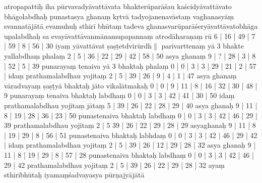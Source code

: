 \documentclass[10pt]{article}
\begin{document}
atropapattiḥ
 iha pūrvavadyāvattāvata bhakterūparāśau kaścidyāvattāvato bhāgolabdhaḥ punastasya ghanaṃ kṛtvā 
 tadyojanenavāstaṃ vaghanasyāṃ svannatājātā evamuhuḥ sthirī bhūtaṃ tadeva ghanasvarūparāśeryāvattāvatobhāga upalabdhaḥ sa evayāvattāvanmānamupapannaṃ 
atrodāharaṇaṃ rū 6 | 16 | 49 | 7 | 59 | 8 | 56 | 30 iyaṃ yāvattāvat ṣaṣṭetdvirūrdh$\|$
parivarttenaṃ yā 3 bhakte yallabdhaṃ phalaṃ 2 | 5 | 36 | 22 | 29 | 42 | 58 | 50 asya ghanaṃ 9 | ? | 28 | 3 | 8 | 52 | 5 | 39 
punarayaṃ tenaiva yā 3 bhaktaḥ phalaṃ 0 | 0 | 3 | 3 | 29 | 21 | 2 | 57 | 
idaṃ prathamalabdhau yojitaṃ 2 | 5 | 39 | 26 | 9 | 4 | 1 | 47 asya ghanaṃ vāradvayaṃ ṣaṣṭyā bhaktaḥ jāto vikalātmakaḥ 0 | 0 | 9 | 11 | 8 | 16 | 32 | 30 | 48 | 9 punarayaṃ tenaiva bhaktaḥ labdhaṃ 0 | 0 | 3 | 3 | 42 | 41 | 30 | 50 
idaṃ prathamalabdhau yojitaṃ jātaṃ 5 | 39 | 26 | 22 | 28 | 29 | 40 asya ghanaḥ 9 | 11 | 8 | 19 | 28 | 36 | 23 | 50 punastenaiva bhaktaḥ labdhaṃ 0 | 0 | 3 | 3 | 42 | 46 | 29 | 39  prathamalabdhau yojitaṃ 2 | 5  39 | 26 | 22 | 29 | 28 | 29 
asyaghanaḥ 9 | 11 | 8 | 19 | 29 | 8 | 56 | 51 punastenaiva bhaktaḥ labhdaṃ 0 | 0 | 3 | 3 | 42 | 46 | 29 | 42 | idaṃ prathamalabdhau yojitaṃ 2 | 5 | 39 | 26 | 12 | 29 | 28 | 32 asya ghanaḥ 9 | 11 | 8 | 19 | 29 | 8 | 57 | 28 
punastenaiva bhaktaḥ labdhaṃ 0 | 0 | 3 | 3 | 42 | 46 | 29 | 42 prathamalabdhau yojitaṃ  2 | 5 | 39 | 26 | 22 | 29 | 28 | 32 ayaṃ sthirībhūtaḥ iyamaṃśadvayasya pūrṇajyājātā 
\end{document}
